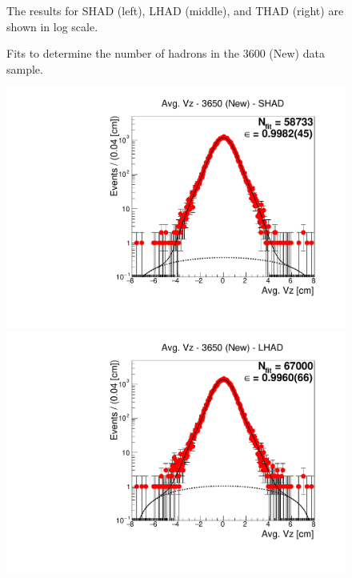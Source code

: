 \begin{figure}[H]
\caption{Fits to determine the number of hadrons in the 3600 (New) data sample.}
{The results for SHAD (left), LHAD (middle), and THAD (right) are shown in log scale.}
\label{fig:hadron_fits_3600_new}
\end{figure}


\begin{figure}[H]
\centering
\includegraphics[scale=0.25]{figures/plots/nonDDbar_fit_results/3650_new/fit_new_3650_data_SHAD.pdf}
\hspace{-0.5cm}
\includegraphics[scale=0.25]{figures/plots/nonDDbar_fit_results/3650_new/fit_new_3650_data_LHAD.pdf}
\hspace{-0.5cm}

\end{figure}
